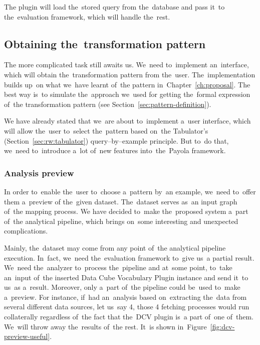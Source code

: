 The plugin will load the~stored query from the~database and pass it~to the~evaluation framework, which will handle the~rest.

\subsection{Obtaining the~transformation pattern}
The more complicated task still awaits us. We~need to~implement an~interface, 
which will obtain the~transformation pattern from the~user. The~implementation 
builds up~on what we~have learnt of~the pattern in~Chapter~\ref{ch:proposal}.
The best way is~to simulate the~approach we~used for getting the~formal expression of~the transformation pattern
(see Section~\ref{sec:pattern-definition}).

We have already stated that we~are about to~implement a~user interface, which 
will allow the~user to~select the~pattern based on~the Tabulator's (Section~\ref{sec:rw:tabulator})
query--by--example principle. But to~do that, we~need to~introduce a~lot of~new 
features into~the~Payola framework.

\subsubsection{Analysis preview}
In order to~enable the~user to~choose a~pattern by~an example, we~need to~offer them a~preview
of the~given dataset. The~dataset serves as~an input graph of~the mapping process. 
We have decided to~make the~proposed system a~part of~the analytical 
pipeline, which brings on~some interesting and unexpected complications.

Mainly, the~dataset may come from any point of~the analytical pipeline execution. In~fact, we~need the~evaluation framework to~give us~a partial result. We~need the~analyzer to~process the~pipeline and at~some point, to~take an~input of~the 
inserted Data Cube Vocabulary Plugin instance and send it~to us~as a~result. 
Moreover, only a~part of~the pipeline could be~used to~make a~preview. For instance, if~had an~analysis
based on~extracting the~data from several different data sources, 
let us~say 4, those 4 fetching processes would run collaterally regardless of~the 
fact that the~DCV plugin is~a part of~one of~them. We~will throw away the~results of~the rest. It~is shown in~Figure~\ref{fig:dcv-preview-useful}.

